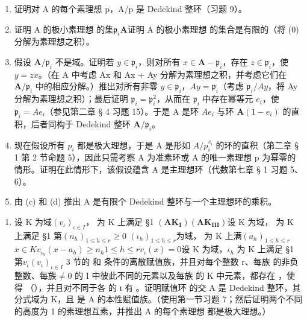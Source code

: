 \begin{enumerate}
\def\labelenumi{(\alph{enumi})}
\item
  证明对 A 的每个素理想 p，A/p 是 Dedekind 整环（习题 9）。
\item
  证明 A 的极小素理想  的集\(\mathfrak{p}_i\)\(\mathbf{A}\)证明 A 的极小素理想  的集合是有限的（将 (0) 分解为素理想之积）。
\item
  假设 \(\mathbf{A} / \mathfrak{p}_i\) 不是域。证明若 \(y \in \mathfrak{p}_i\)，则对所有 \(x \in \mathbf{A} - \mathfrak{p}_i\)，存在 \(z \in \mathfrak{p}_i\)，使 \(y = zx\)。（在 A 中考虑 Ax 和 Ax + Ay 分解为素理想之积，并考虑它们在 \(\mathbf{A} / \mathfrak{p}_i\) 中的相应分解。）推出对所有非零 \(y \in \mathfrak{p}_i\)，\(Ay = \mathfrak{p}_i\)（考虑 \(\mathfrak{p}_i / Ay\)，将 Ay 分解为素理想之积）；最后证明 \(\mathfrak{p}_i = \mathfrak{p}_i^2\)，从而在 \(\mathfrak{p}_i\) 中存在幂等元 \(e_i\)，使 \(\mathfrak{p}_i = Ae_i\)（参见第二章 § 4 习题 15）。于是 A 是环 \(Ae_i\) 与环 \(\mathbf{A}(1 - e_i)\) 的直积，后者同构于 Dedekind 整环 \(\mathbf{A} / \mathfrak{p}_i\)。
\item
  现在假设所有 \(p_{i}\) 都是极大理想，于是 A 是形如 \(A/p_{i}^{v_{i}}\) 的环的直积（第二章 § 1 第 2 节命题 5），因此只需考察 A 为准素环或 A 的唯一素理想 p 为幂零的情形。证明在此情形下，该假设蕴含 A 是主理想环（代数第七章 § 1 习题 5、6）。
\item
  由 (c) 和 (d) 推出 A 是有限个 Dedekind 整环与一个主理想环的乘积。
\end{enumerate}

\begin{enumerate}
\def\labelenumi{\arabic{enumi}.}
\setcounter{enumi}{10}
\tightlist
\item
  设 K 为域\((v_{\iota})_{\iota\in I}\)， 为 K 上满足 §1 \((\mathbf{AK}_{\mathbf{I}})\)\((\mathbf{AK}_{\mathbf{III}})\)设 K 为域， 为 K 上满足 §1 第\((n_{h})_{1\leqslant h\leqslant r}\)\(\geqslant0\) \((\iota_{h})_{1\leqslant h\leqslant r}\)为域， 为 K 上满\((a_{h})_{1\leqslant h\leqslant r}\)\(x\in K\)\(v_{\iota_{h}}(x-a_{h})\geqslant n_{h}\)\(1\leqslant h\leqslant r\)\(v_{\iota}(x)=0\)设 K 为域，\(\iota_{h}\) 为 K 上满足 §1 第\(v_{\iota}\)\((v_{\iota})_{\iota\in I}\) 3 节的  和  条件的离散赋值族，并且对每个整数 r、每族  的非负整数、每族\(\neq0\)  的 I 中彼此不同的元素以及每族  的 K 中元素，都存在 ，使得 （），并且对不同于各  的 ι 有 。证明赋值环  的交 A 是 Dedekind 整环，其分式域为 K，且  是 A 的本性赋值族。（使用第一节习题 7；然后证明两个不同的高度为 1 的素理想互素，并推出 A 的每个素理想  都是极大理想。）
\end{enumerate}

